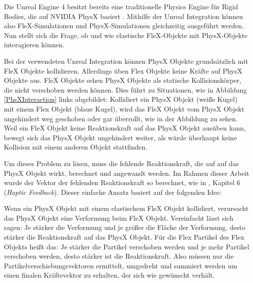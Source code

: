  
Die Unreal Engine 4 besitzt bereits eine traditionelle Physics Engine für Rigid Bodies, die auf NVIDIA PhysX basiert \cite{ue4physics}. Mithilfe der Unreal Integration können also  FleX-Simulationen und PhysX-Simulationen gleichzeitig ausgeführt werden. Nun stellt sich die Frage, ob und wie elastische  FleX-Objekte mit PhysX-Objekte interagieren können.

Bei der verwendeten Unreal Integration können PhysX Objekte grundsätzlich mit FleX Objekte kollidieren. Allerdings üben Flex Objekte keine Kräfte auf PhysX Objekte aus. FleX Objekte sehen PhysX Objekte als statische Kollisionskörper, die nicht verschoben werden können. Dies führt zu Situationen, wie in Abbildung \ref{PhsXInteraction} links abgebildet: Kollidiert ein PhysX Objekt (weiße Kugel) mit einem Flex Objekt (blaue Kugel), wird das FleX Objekt vom PhysX Objekt ungehindert weg geschoben oder gar überrollt, wie in der Abbildung zu sehen. Weil ein FleX Objekt keine Reaktionskraft auf das PhysX Objekt ausüben kann, bewegt sich das PhysX Objekt ungehindert weiter, als würde überhaupt keine Kollision mit einem anderen Objekt stattfinden.


Um dieses Problem zu lösen, muss die fehlende Reaktionskraft, die auf auf das PhysX Objekt wirkt, berechnet und angewandt werden. 
Im Rahmen dieser Arbeit wurde der Vektor der fehlenden Reaktionskraft so berechnet, wie in \cite{VRSim20}, Kapitel 6 (\textit{Haptic Feedback}). Dieser einfache Ansatz basiert auf der folgenden Idee: 

Wenn ein PhysX Objekt mit einem elastischem FleX Objekt kollidiert, verursacht das PhysX Objekt eine Verformung beim FleX Objekt. Vereinfacht lässt sich sagen: Je stärker die Verformung und je größer die Fläche der Verformung, desto stärker die Reaktionskraft auf das PhysX Objekt. Für die Flex Partikel des Flex Objekts heißt das: Je stärker die Partikel verschoben werden und je mehr Partikel verschoben werden, desto stärker ist die Reaktionskraft. Also müssen nur die Partikelverschiebungsvektoren ermittelt, umgedreht und summiert werden um einen finalen Kräftevektor zu erhalten, der sich wie gewünscht verhält. 

